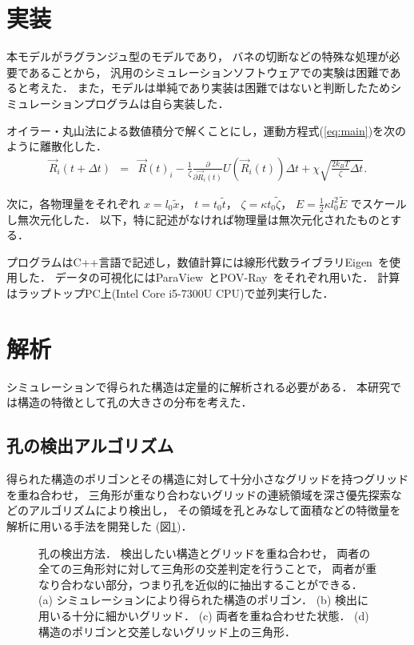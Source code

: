 \section{実装}
本モデルがラグランジュ型のモデルであり，
バネの切断などの特殊な処理が必要であることから，
汎用のシミュレーションソフトウェアでの実験は困難であると考えた．
また，モデルは単純であり実装は困難ではないと判断したためシミュレーションプログラムは自ら実装した．

オイラー・丸山法による数値積分で解くことにし，運動方程式(\ref{eq:main})を次のように離散化した．
\begin{eqnarray}
    \vec{R}_i(t+\Delta t) &=& 
    \vec{R}(t)_i
    -\frac{1}{\zeta}\frac{\partial}{\partial\vec{R}_i(t)}U(\vec{R}_i(t))\Delta t
    +\chi\sqrt{\frac{2k_B T}{\zeta}\Delta t}
    .
\end{eqnarray}

次に，各物理量をそれぞれ
$x=l_0 \tilde{x}$，
$t=t_0 \tilde{t}$，
$\zeta=\kappa t_0 \tilde{\zeta}$，
$E=\frac{1}{2}\kappa l_0^2\tilde{E}$
でスケールし無次元化した．
以下，特に記述がなければ物理量は無次元化されたものとする．

プログラムはC++言語で記述し，数値計算には線形代数ライブラリEigen~\cite{eigenweb}を使用した．
データの可視化にはParaView~\cite{paraview}とPOV-Ray~\cite{povray}をそれぞれ用いた．
計算はラップトップPC上(Intel Core i5-7300U CPU)で並列実行した．


\section{解析}
シミュレーションで得られた構造は定量的に解析される必要がある．
本研究では構造の特徴として孔の大きさの分布を考えた．


\subsection{孔の検出アルゴリズム}
得られた構造のポリゴンとその構造に対して十分小さなグリッドを持つグリッドを重ね合わせ，
三角形が重なり合わないグリッドの連続領域を深さ優先探索などのアルゴリズムにより検出し，
その領域を孔とみなして面積などの特徴量を解析に用いる手法を開発した
(図\ref{fig:xor})．
\begin{figure}
    \centering
    
    \caption{
        孔の検出方法．
        検出したい構造とグリッドを重ね合わせ，
        両者の全ての三角形対に対して三角形の交差判定を行うことで，
        両者が重なり合わない部分，つまり孔を近似的に抽出することができる．
        (a) シミュレーションにより得られた構造のポリゴン．
        (b) 検出に用いる十分に細かいグリッド．
        (c) 両者を重ね合わせた状態．
        (d) 構造のポリゴンと交差しないグリッド上の三角形．
    }
    \label{fig:xor}
\end{figure}


